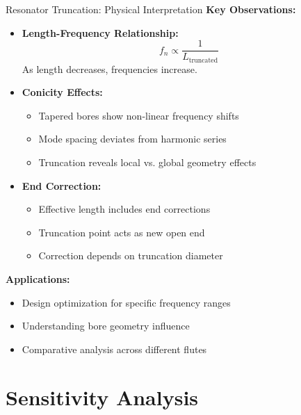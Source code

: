 \documentclass[aspectratio=169,10pt]{beamer}
\begin{document}
\begin{frame}{Resonator Truncation: Physical Interpretation}
\textbf{Key Observations:}

\begin{itemize}
    \item \textbf{Length-Frequency Relationship:}
    \begin{equation*}
    f_n \propto \frac{1}{L_{\text{truncated}}}
    \end{equation*}
    As length decreases, frequencies increase.
    
    \item \textbf{Conicity Effects:}
    \begin{itemize}
        \item Tapered bores show non-linear frequency shifts
        \item Mode spacing deviates from harmonic series
        \item Truncation reveals local vs. global geometry effects
    \end{itemize}
    
    \item \textbf{End Correction:}
    \begin{itemize}
        \item Effective length includes end corrections
        \item Truncation point acts as new open end
        \item Correction depends on truncation diameter
    \end{itemize}
\end{itemize}

\textbf{Applications:}
\begin{itemize}
    \item Design optimization for specific frequency ranges
    \item Understanding bore geometry influence
    \item Comparative analysis across different flutes
\end{itemize}
\end{frame}

\section{Sensitivity Analysis}
\end{document}
